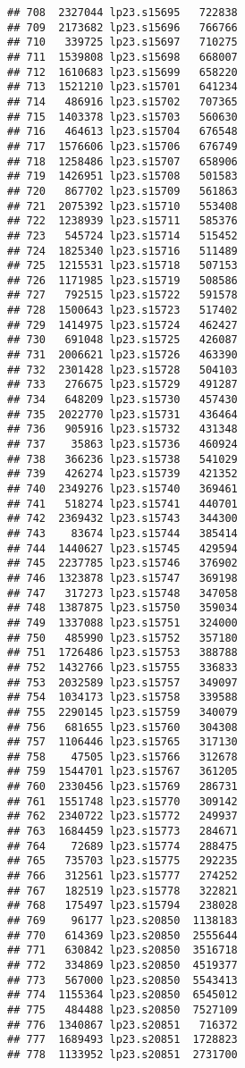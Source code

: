 \documentclass[
]{article}
\begin{document}
\begin{verbatim}
## 708  2327044 lp23.s15695   722838
## 709  2173682 lp23.s15696   766766
## 710   339725 lp23.s15697   710275
## 711  1539808 lp23.s15698   668007
## 712  1610683 lp23.s15699   658220
## 713  1521210 lp23.s15701   641234
## 714   486916 lp23.s15702   707365
## 715  1403378 lp23.s15703   560630
## 716   464613 lp23.s15704   676548
## 717  1576606 lp23.s15706   676749
## 718  1258486 lp23.s15707   658906
## 719  1426951 lp23.s15708   501583
## 720   867702 lp23.s15709   561863
## 721  2075392 lp23.s15710   553408
## 722  1238939 lp23.s15711   585376
## 723   545724 lp23.s15714   515452
## 724  1825340 lp23.s15716   511489
## 725  1215531 lp23.s15718   507153
## 726  1171985 lp23.s15719   508586
## 727   792515 lp23.s15722   591578
## 728  1500643 lp23.s15723   517402
## 729  1414975 lp23.s15724   462427
## 730   691048 lp23.s15725   426087
## 731  2006621 lp23.s15726   463390
## 732  2301428 lp23.s15728   504103
## 733   276675 lp23.s15729   491287
## 734   648209 lp23.s15730   457430
## 735  2022770 lp23.s15731   436464
## 736   905916 lp23.s15732   431348
## 737    35863 lp23.s15736   460924
## 738   366236 lp23.s15738   541029
## 739   426274 lp23.s15739   421352
## 740  2349276 lp23.s15740   369461
## 741   518274 lp23.s15741   440701
## 742  2369432 lp23.s15743   344300
## 743    83674 lp23.s15744   385414
## 744  1440627 lp23.s15745   429594
## 745  2237785 lp23.s15746   376902
## 746  1323878 lp23.s15747   369198
## 747   317273 lp23.s15748   347058
## 748  1387875 lp23.s15750   359034
## 749  1337088 lp23.s15751   324000
## 750   485990 lp23.s15752   357180
## 751  1726486 lp23.s15753   388788
## 752  1432766 lp23.s15755   336833
## 753  2032589 lp23.s15757   349097
## 754  1034173 lp23.s15758   339588
## 755  2290145 lp23.s15759   340079
## 756   681655 lp23.s15760   304308
## 757  1106446 lp23.s15765   317130
## 758    47505 lp23.s15766   312678
## 759  1544701 lp23.s15767   361205
## 760  2330456 lp23.s15769   286731
## 761  1551748 lp23.s15770   309142
## 762  2340722 lp23.s15772   249937
## 763  1684459 lp23.s15773   284671
## 764    72689 lp23.s15774   288475
## 765   735703 lp23.s15775   292235
## 766   312561 lp23.s15777   274252
## 767   182519 lp23.s15778   322821
## 768   175497 lp23.s15794   238028
## 769    96177 lp23.s20850  1138183
## 770   614369 lp23.s20850  2555644
## 771   630842 lp23.s20850  3516718
## 772   334869 lp23.s20850  4519377
## 773   567000 lp23.s20850  5543413
## 774  1155364 lp23.s20850  6545012
## 775   484488 lp23.s20850  7527109
## 776  1340867 lp23.s20851   716372
## 777  1689493 lp23.s20851  1728823
## 778  1133952 lp23.s20851  2731700

\end{verbatim}
\end{document}
